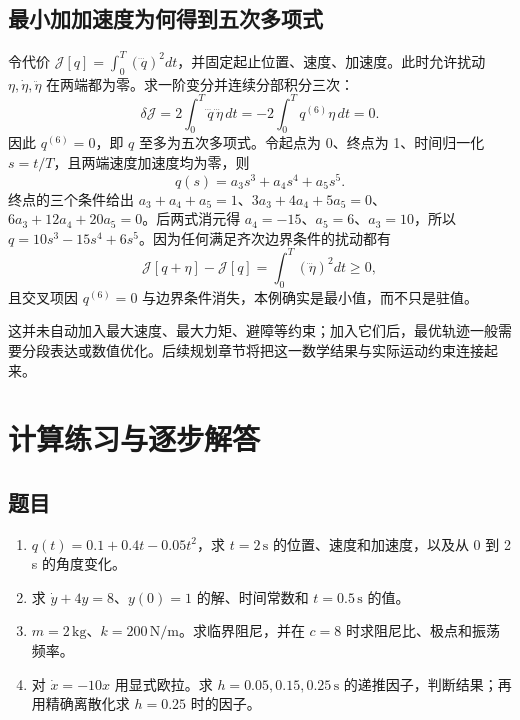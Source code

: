 \subsection{最小加加速度为何得到五次多项式}
令代价 $\mathcal J[q]=\int_0^T(\dddot q)^2dt$，并固定起止位置、速度、加速度。此时允许扰动 $\eta,\dot\eta,\ddot\eta$ 在两端都为零。求一阶变分并连续分部积分三次：
\begin{equation}
 \delta\mathcal J=2\int_0^T\dddot q\,\dddot\eta\,dt
 =-2\int_0^T q^{(6)}\eta\,dt=0.
\end{equation}
因此 $q^{(6)}=0$，即 $q$ 至多为五次多项式。令起点为 0、终点为 1、时间归一化 $s=t/T$，且两端速度加速度均为零，则
\begin{equation}
 q(s)=a_3s^3+a_4s^4+a_5s^5.
\end{equation}
终点的三个条件给出 $a_3+a_4+a_5=1$、$3a_3+4a_4+5a_5=0$、$6a_3+12a_4+20a_5=0$。后两式消元得 $a_4=-15$、$a_5=6$、$a_3=10$，所以 $q=10s^3-15s^4+6s^5$。因为任何满足齐次边界条件的扰动都有
\[
 \mathcal J[q+\eta]-\mathcal J[q]
 =\int_0^T(\dddot\eta)^2dt\ge0,
\]
且交叉项因 $q^{(6)}=0$ 与边界条件消失，本例确实是最小值，而不只是驻值。

这并未自动加入最大速度、最大力矩、避障等约束；加入它们后，最优轨迹一般需要分段表达或数值优化。后续规划章节将把这一数学结果与实际运动约束连接起来。

\section{计算练习与逐步解答}
\subsection*{题目}
\begin{enumerate}
\item $q(t)=0.1+0.4t-0.05t^2$，求 $t=2\,\mathrm s$ 的位置、速度和加速度，以及从 0 到 2 s 的角度变化。
\item 求 $\dot y+4y=8$、$y(0)=1$ 的解、时间常数和 $t=0.5\,\mathrm s$ 的值。
\item $m=2\,\mathrm{kg}$、$k=200\,\mathrm{N/m}$。求临界阻尼，并在 $c=8$ 时求阻尼比、极点和振荡频率。
\item 对 $\dot x=-10x$ 用显式欧拉。求 $h=0.05,0.15,0.25\,\mathrm s$ 的递推因子，判断结果；再用精确离散化求 $h=0.25$ 时的因子。
\end{enumerate}

